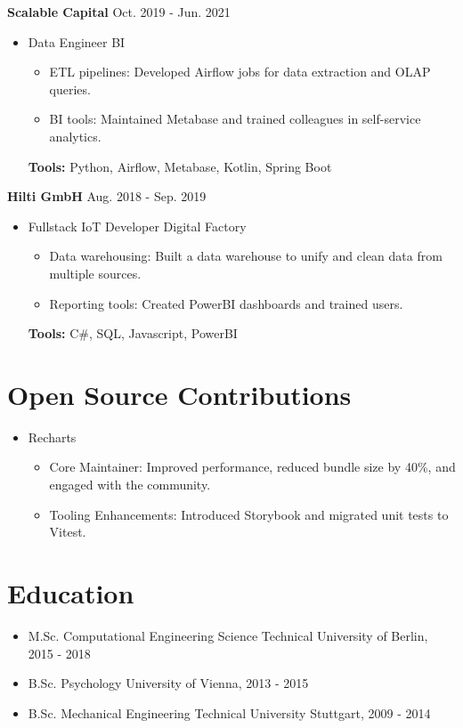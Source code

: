 \documentclass[letterpaper,11pt]{article}
\newcommand{\roleSpacing}{\vspace{4pt}}
\newcommand{\role}[2]{\item{#1 \hfill #2 \\}} %
\newcommand{\station}[2]{\textbf{#1}  \hfill #2 \\} %
\newcommand{\project}[2]{\item\small{#1: #2}} %
\newcommand{\resumeSubHeadingListStart}{\begin{itemize}[leftmargin=*]}
\newcommand{\resumeSubHeadingListEnd}{\end{itemize}}
\newcommand{\projectliststart}{\begin{itemize}[leftmargin=*] \vspace{-5pt} }
\newcommand{\projectlistend}{\end{itemize}\vspace{-5pt}}
\begin{document}
\roleSpacing

\station{Scalable Capital}{Oct. 2019 - Jun. 2021}
\resumeSubHeadingListStart
\role{Data Engineer}{BI}
\projectliststart
\project{ETL pipelines}{Developed Airflow jobs for data extraction and OLAP queries.}
\project{BI tools}{Maintained Metabase and trained colleagues in self-service analytics.}
\projectlistend
\textbf{Tools:} Python, Airflow, Metabase, Kotlin, Spring Boot
\resumeSubHeadingListEnd

\roleSpacing

\station{Hilti GmbH}{Aug. 2018 - Sep. 2019}
\resumeSubHeadingListStart
\role{Fullstack IoT Developer}{Digital Factory}
\projectliststart
\project{Data warehousing}{Built a data warehouse to unify and clean data from multiple sources.}
\project{Reporting tools}{Created PowerBI dashboards and trained users.}
\projectlistend
\textbf{Tools:} C\#, SQL, Javascript, PowerBI
\resumeSubHeadingListEnd

\section{Open Source Contributions}

\resumeSubHeadingListStart
\role{Recharts}{}
\projectliststart
\project{Core Maintainer}{Improved performance, reduced bundle size by 40\%, and engaged with the community.}
\project{Tooling Enhancements}{Introduced Storybook and migrated unit tests to Vitest.}
\projectlistend
\resumeSubHeadingListEnd

\section{Education}
\resumeSubHeadingListStart
\role{M.Sc. Computational Engineering Science}{Technical University of Berlin, 2015 - 2018}
\role{B.Sc. Psychology}{University of Vienna, 2013 - 2015}
\role{B.Sc. Mechanical Engineering}{Technical University Stuttgart, 2009 - 2014}
\resumeSubHeadingListEnd
\end{document}
